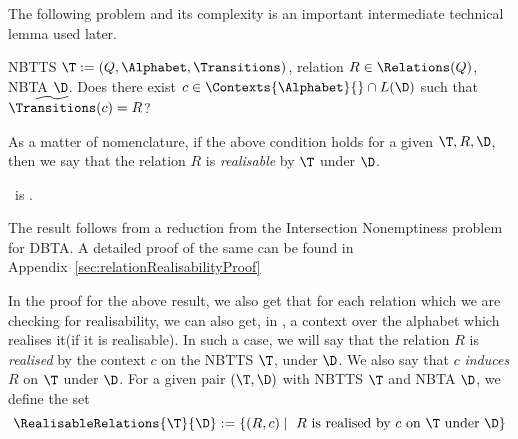 The following problem and its complexity is an important intermediate technical lemma used later.

\noindent
\probdef{\relationRealisabilityFull}
{NBTTS $\T := (Q, \Alphabet, \Transitions)$, relation $R \in \Relations(Q)$, NBTA $\D$.}
{Does there exist $c \in \Contexts{\Alphabet}{} \cap L(\D)$ such that $\widetilde{\Transitions}(c) = R$?}

As a matter of nomenclature, if the above condition holds for a given $\T, R, \D$, then we say that the relation $R$ is \emph{realisable} by $\T$ under $\D$.

\begin{theorem}\label{thm:relationRealisabilityExptc}
  \textsc{\relationRealisabilityFull}\ is \exptc.
\end{theorem}

The result follows from a reduction from the Intersection Nonemptiness problem for DBTA. A detailed proof of the same can be found in Appendix~\ref{sec:relationRealisabilityProof}

In the proof for the above result, we also get that for each relation which we are checking for realisability, we can also get, in \expt, a context over the alphabet which realises it(if it is realisable). In such a case, we will say that the relation $R$ is \emph{realised} by the context $c$ on the NBTTS $\T$, under $\D$. We also say that $c$ \emph{induces} $R$ on $\T$ under $\D$.  For a given pair $(\T, \D)$ with NBTTS $\T$ and NBTA $\D$, we define the set
\[ \RealisableRelations{\T}{\D} := \{(R, c) \mid \mbox{ $R$ is realised by $c$ on $\T$ under $\D$}\} \]